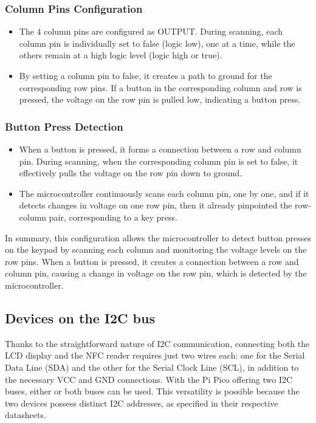 \subsubsection*{Column Pins Configuration}
\begin{itemize}
	\item The 4 column pins are configured as OUTPUT. During scanning, each column pin is individually set to false (logic 
	low), one at a time, while the others remain at a high logic level (logic high or true).
	\item By setting a column pin to false, it creates a path to ground for the corresponding row pins. If a button in the 
	corresponding column and row is pressed, the voltage on the row pin is pulled low, indicating a button press.
\end{itemize}

\subsubsection*{Button Press Detection}
\begin{itemize}
	\item When a button is pressed, it forms a connection between a row and column pin. During scanning, when the 
	corresponding column pin is set to false, it effectively pulls the voltage on the row pin down to ground.
	\item The microcontroller continuously scans each column pin, one by one, and if it detects changes in voltage on one 
	row pin, then it already pinpointed the row-column pair, corresponding to a key press.
\end{itemize}

In summary, this configuration allows the microcontroller to detect button presses on the keypad by scanning each column 
and monitoring the voltage levels on the row pins. When a button is pressed, it creates a connection between a row and 
column pin, causing a change in voltage on the row pin, which is detected by the microcontroller.


\subsection{Devices on the I2C bus}

Thanks to the straightforward nature of I2C communication, connecting both the LCD display and the NFC reader requires 
just two wires each: one for the Serial Data Line (SDA) and the other for the Serial Clock Line (SCL), in addition to 
the necessary VCC and GND connections. With the Pi Pico offering two I2C buses, either or both buses can be used. This 
versatility is possible because the two devices possess distinct I2C addresses, as specified in their respective 
datasheets.

